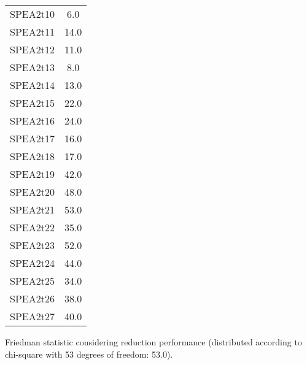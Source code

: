 \documentclass{article}
\begin{document}
\begin{table}[!htp]
\begin{tabular}{c|c}
SPEA2t10&6.0\\
SPEA2t11&14.0\\
SPEA2t12&11.0\\
SPEA2t13&8.0\\
SPEA2t14&13.0\\
SPEA2t15&22.0\\
SPEA2t16&24.0\\
SPEA2t17&16.0\\
SPEA2t18&17.0\\
SPEA2t19&42.0\\
SPEA2t20&48.0\\
SPEA2t21&53.0\\
SPEA2t22&35.0\\
SPEA2t23&52.0\\
SPEA2t24&44.0\\
SPEA2t25&34.0\\
SPEA2t26&38.0\\
SPEA2t27&40.0\\
\end{tabular}
\end{table}


Friedman statistic considering reduction performance (distributed according to chi-square with 53 degrees of freedom: 53.0).
\end{document}
